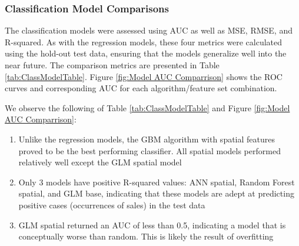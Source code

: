 \documentclass[12pt,]{article}
\providecommand{\tightlist}{%
  \setlength{\itemsep}{0pt}\setlength{\parskip}{0pt}}
\begin{document}
\hypertarget{classification-model-comparisons}{%
\subsubsection{Classification Model
Comparisons}\label{classification-model-comparisons}}

The classification models were assessed using AUC as well as MSE, RMSE,
and R-squared. As with the regression models, these four metrics were
calculated using the hold-out test data, ensuring that the models
generalize well into the near future. The comparison metrics are
presented in Table \ref{tab:ClassModelTable}. Figure
\ref{fig:Model AUC Comparrison} shows the ROC curves and corresponding
AUC for each algorithm/feature set combination.

\noindent We observe the following of Table \ref{tab:ClassModelTable}
and Figure \ref{fig:Model AUC Comparrison}:

\begin{enumerate}
\def\labelenumi{\arabic{enumi})}
\tightlist
\item
  Unlike the regression models, the GBM algorithm with spatial features
  proved to be the best performing classifier. All spatial models
  performed relatively well except the GLM spatial model
\item
  Only 3 models have positive R-squared values: ANN spatial, Random
  Forest spatial, and GLM base, indicating that these models are adept
  at predicting positive cases (occurrences of sales) in the test data
\item
  GLM spatial returned an AUC of less than 0.5, indicating a model that
  is conceptually worse than random. This is likely the result of
  overfitting
\end{enumerate}
\end{document}
